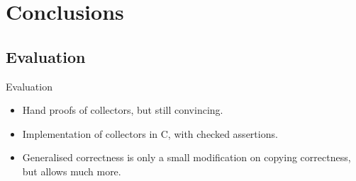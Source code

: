 \documentclass[usenames,dvipsnames]{beamer}
\begin{document}

\section{Conclusions}
\subsection{Evaluation}

\begin{frame}{Evaluation}
  \begin{itemize}
  \item Hand proofs of collectors, but still convincing.
  \item Implementation of collectors in C, with checked assertions.
  \item Generalised correctness is only a small modification on
    copying correctness, but allows much more.
  \end{itemize}



\end{frame}
\end{document}
